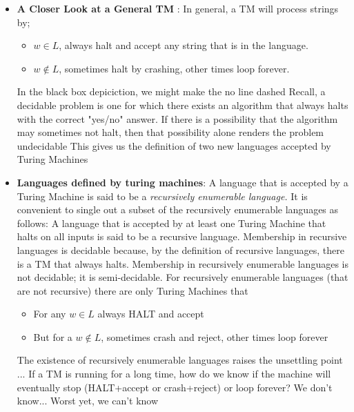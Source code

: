 \documentclass{report}
\begin{document}
\begin{itemize}
        \item \textbf{A Closer Look at a General TM }: In general, a TM will process strings by;
            \begin{itemize}
                \item $w \in L$, always halt and accept any string that is in the language.
                \item $w \not\in L$, sometimes halt by crashing, other times loop forever. 
            \end{itemize}
            \bigbreak \noindent 
            In the black box depiciction, we might make the no line dashed
            \bigbreak \noindent 
            Recall, a decidable problem is one for which there exists an algorithm that always halts with the correct "yes/no" answer.
            \bigbreak \noindent 
            If there is a possibility that the algorithm may sometimes not halt, then that possibility alone renders the problem undecidable
            \bigbreak \noindent 
            This gives us the definition of two new languages accepted by Turing Machines
        \item \textbf{Languages defined by turing machines}: A language that is accepted by a Turing Machine is said to be a \textit{recursively enumerable language.}
            \bigbreak \noindent 
            It is convenient to single out a subset of the recursively enumerable languages as follows:
            \bigbreak \noindent 
            A language that is accepted by at least one Turing Machine that halts on all inputs is said to be a recursive language.
            \bigbreak \noindent 
            Membership in recursive languages is decidable because, by the definition of recursive languages, there is a TM that always halts.
            \bigbreak \noindent 
            Membership in recursively enumerable languages is not decidable; it is semi-decidable. For recursively enumerable languages (that are not recursive) there are only Turing Machines that
            \begin{itemize}
                \item For any $w \in L$ always HALT and accept
                \item But for a $w \not\in L$, sometimes crash and reject, other times loop forever
            \end{itemize}
            \bigbreak \noindent 
            The existence of recursively enumerable languages raises the unsettling point ...
            \bigbreak \noindent 
            If a TM is running for a long time, how do we know if the machine will eventually stop (HALT+accept or crash+reject) or loop forever?
            \bigbreak \noindent 
            We don't know... Worst yet, we can't know
            \bigbreak \noindent 

    \end{itemize}
\end{document}
